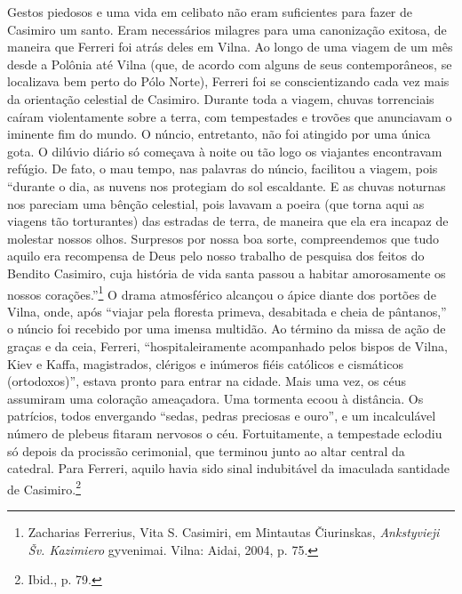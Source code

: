 Gestos piedosos e uma vida em celibato não eram suficientes para fazer
de Casimiro um santo. Eram necessários milagres para uma canonização
exitosa, de maneira que Ferreri foi atrás deles em Vilna. Ao longo de
uma viagem de um mês desde a Polônia até Vilna (que, de acordo com
alguns de seus contemporâneos, se localizava bem perto do Pólo Norte),
Ferreri foi se conscientizando cada vez mais da orientação celestial de
Casimiro. Durante toda a viagem, chuvas torrenciais caíram violentamente
sobre a terra, com tempestades e trovões que anunciavam o iminente fim
do mundo. O núncio, entretanto, não foi atingido por uma única gota. O
dilúvio diário só começava à noite ou tão logo os viajantes encontravam
refúgio. De fato, o mau tempo, nas palavras do núncio, facilitou a
viagem, pois ``durante o dia, as nuvens nos protegiam do sol escaldante.
E as chuvas noturnas nos pareciam uma bênção celestial, pois lavavam a
poeira (que torna aqui as viagens tão torturantes) das estradas de
terra, de maneira que ela era incapaz de molestar nossos olhos.
Surpresos por nossa boa sorte, compreendemos que tudo aquilo era
recompensa de Deus pelo nosso trabalho de pesquisa dos feitos do Bendito
Casimiro, cuja história de vida santa passou a habitar amorosamente os
nossos corações.''\footnote{Zacharias Ferrerius, Vita S. Casimiri, em Mintautas Čiurinskas, \textit{Ankstyvieji Šv. Kazimiero} gyvenimai. Vilna: Aidai, 2004, p. 75.}
O drama atmosférico alcançou o ápice diante dos portões de Vilna, onde,
após ``viajar pela floresta primeva, desabitada e cheia de pântanos,'' o
núncio foi recebido por uma imensa multidão. Ao término da missa de ação
de graças e da ceia, Ferreri, ``hospitaleiramente acompanhado pelos
bispos de Vilna, Kiev e Kaffa, magistrados, clérigos e inúmeros fiéis
católicos e cismáticos (ortodoxos)'', estava pronto para entrar na
cidade. Mais uma vez, os céus assumiram uma coloração ameaçadora. Uma
tormenta ecoou à distância. Os patrícios, todos envergando ``sedas,
pedras preciosas e ouro'', e um incalculável número de plebeus fitaram
nervosos o céu. Fortuitamente, a tempestade eclodiu só depois da
procissão cerimonial, que terminou junto ao altar central da catedral.
Para Ferreri, aquilo havia sido sinal indubitável da imaculada santidade
de Casimiro.\footnote{Ibid., p. 79.}

